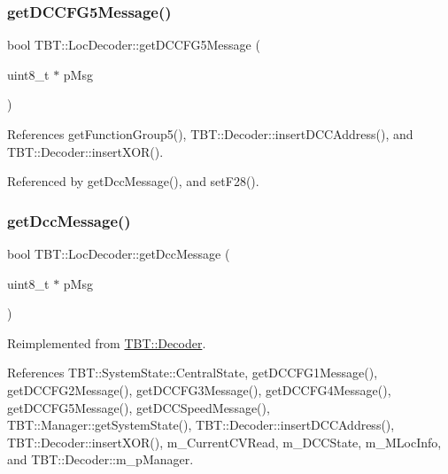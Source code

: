 \subsubsection{\texorpdfstring{get\+D\+C\+C\+F\+G5\+Message()}{getDCCFG5Message()}}
{\footnotesize\ttfamily bool T\+B\+T\+::\+Loc\+Decoder\+::get\+D\+C\+C\+F\+G5\+Message (\begin{DoxyParamCaption}\item[{uint8\+\_\+t $\ast$}]{p\+Msg }\end{DoxyParamCaption})\hspace{0.3cm}{\ttfamily [protected]}}



References get\+Function\+Group5(), T\+B\+T\+::\+Decoder\+::insert\+D\+C\+C\+Address(), and T\+B\+T\+::\+Decoder\+::insert\+X\+O\+R().



Referenced by get\+Dcc\+Message(), and set\+F28().

\mbox{\label{classTBT_1_1LocDecoder_a00361e87af456a020bc6ec16c08237ef_a00361e87af456a020bc6ec16c08237ef}} 
\subsubsection{\texorpdfstring{get\+Dcc\+Message()}{getDccMessage()}}
{\footnotesize\ttfamily bool T\+B\+T\+::\+Loc\+Decoder\+::get\+Dcc\+Message (\begin{DoxyParamCaption}\item[{uint8\+\_\+t $\ast$}]{p\+Msg }\end{DoxyParamCaption})\hspace{0.3cm}{\ttfamily [virtual]}}



Reimplemented from \hyperlink{classTBT_1_1Decoder_a71c25cd52e7f591ba1771ee0518735ba_a71c25cd52e7f591ba1771ee0518735ba}{T\+B\+T\+::\+Decoder}.



References T\+B\+T\+::\+System\+State\+::\+Central\+State, get\+D\+C\+C\+F\+G1\+Message(), get\+D\+C\+C\+F\+G2\+Message(), get\+D\+C\+C\+F\+G3\+Message(), get\+D\+C\+C\+F\+G4\+Message(), get\+D\+C\+C\+F\+G5\+Message(), get\+D\+C\+C\+Speed\+Message(), T\+B\+T\+::\+Manager\+::get\+System\+State(), T\+B\+T\+::\+Decoder\+::insert\+D\+C\+C\+Address(), T\+B\+T\+::\+Decoder\+::insert\+X\+O\+R(), m\+\_\+\+Current\+C\+V\+Read, m\+\_\+\+D\+C\+C\+State, m\+\_\+\+M\+Loc\+Info, and T\+B\+T\+::\+Decoder\+::m\+\_\+p\+Manager.

